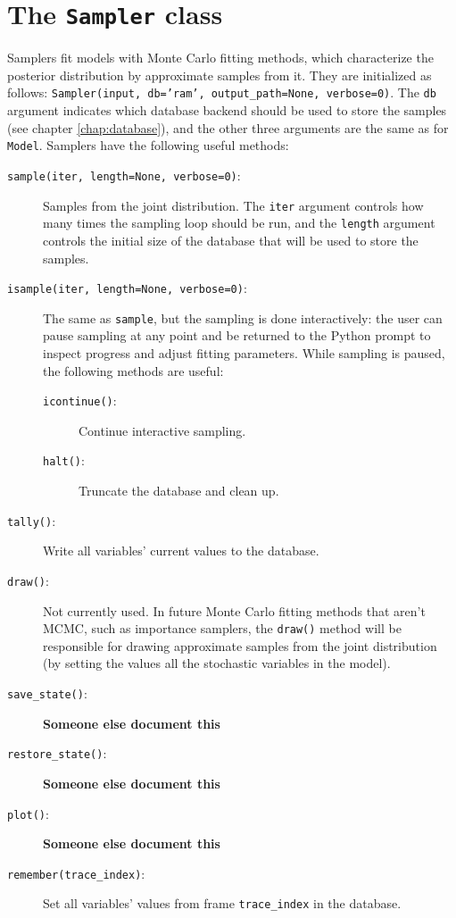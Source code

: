 \section{The \texttt{Sampler} class} 
Samplers fit models with Monte Carlo fitting methods, which characterize the posterior distribution by approximate samples from it. They are initialized as follows: \texttt{Sampler(input, db='ram', output\_path=None, verbose=0)}. The \texttt{db} argument indicates which database backend should be used to store the samples (see chapter \ref{chap:database}), and the other three arguments are the same as for \texttt{Model}. Samplers have the following useful methods:
\begin{description}
    \item[\texttt{sample(iter, length=None, verbose=0)}:] Samples from the joint distribution. The \texttt{iter} argument controls how many times the sampling loop should be run, and the \texttt{length} argument controls the initial size of the database that will be used to store the samples.
    \item[\texttt{isample(iter, length=None, verbose=0)}:] The same as \texttt{sample}, but the sampling is done interactively: the user can pause sampling at any point and be returned to the Python prompt to inspect progress and adjust fitting parameters. While sampling is paused, the following methods are useful: 
    \begin{description}
        \item[\texttt{icontinue()}:] Continue interactive sampling.
        \item[\texttt{halt()}:] Truncate the database and clean up.
    \end{description}
    \item[\texttt{tally()}:] Write all variables' current values to the database.
    \item[\texttt{draw()}:] Not currently used. In future Monte Carlo fitting methods that aren't MCMC, such as importance samplers, the \texttt{draw()} method will be responsible for drawing approximate samples from the joint distribution (by setting the values all the stochastic variables in the model).
    \item[\texttt{save\_state()}:] \textbf{Someone else document this}
    \item[\texttt{restore\_state()}:] \textbf{Someone else document this}
    \item[\texttt{plot()}:] \textbf{Someone else document this}
    \item[\texttt{remember(trace\_index)}:] Set all variables' values from frame \texttt{trace\_index} in the database.
\end{description}

